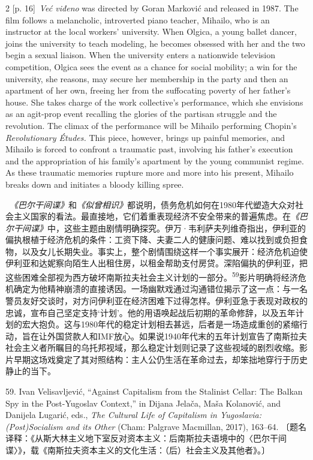 \documentclass[10pt,a4paper]{article}
\begin{document}
\begin{paracol}{2}
{\scriptsize\color{gray} [p. 16]}\ \textit{Već viđeno} was directed by Goran Marković and released in 1987. The film follows a melancholic, introverted piano teacher, Mihailo, who is an instructor at the local workers’ university. When Olgica, a young ballet dancer, joins the university to teach modeling, he becomes obsessed with her and the two begin a sexual liaison. When the university enters a nationwide television competition, Olgica sees the event as a chance for social mobility; a win for the university, she reasons, may secure her membership in the party and then an apartment of her own, freeing her from the suffocating poverty of her father’s house. She takes charge of the work collective’s performance, which she envisions as an agit-prop event recalling the glories of the partisan struggle and the revolution. The climax of the performance will be Mihailo performing Chopin’s \textit{Revolutionary Études.} This piece, however, brings up painful memories, and Mihailo is forced to confront a traumatic past, involving his father’s execution and the appropriation of his family’s apartment by the young communist regime. As these traumatic memories rupture more and more into his present, Mihailo breaks down and initiates a bloody killing spree.\par
\switchcolumn*
{\scriptsize\color{gray} [p. 17]}\ \textit{《巴尔干间谍》}和\textit{《似曾相识》}都说明，债务危机如何在1980年代塑造大众对社会主义国家的看法。最直接地，它们着重表现经济不安全带来的普遍焦虑。在\textit{《巴尔干间谍》}中，这些主题由剧情明确探究。伊万·韦利萨夫列维奇指出，伊利亚的偏执根植于经济危机的条件：工资下降、夫妻二人的健康问题、难以找到或负担食物，以及女儿长期失业。事实上，整个剧情围绕这样一个事实展开：经济危机迫使伊利亚和达妮察向陌生人出租住房，以租金帮助支付房贷。深陷偏执的伊利亚，把这些困难全部视为西方破坏南斯拉夫社会主义计划的一部\mbox{分。\textsuperscript{59}}影片明确将经济危机确定为他精神崩溃的直接诱因。一场幽默戏通过沟通错位揭示了这一点：与一名警员友好交谈时，对方问伊利亚在经济困难下过得怎样。伊利亚急于表现对政权的忠诚，宣布自己坚定支持‘计划’。他的用语唤起战后初期的革命修辞，以及五年计划的宏大抱负。这与1980年代的稳定计划相去甚远，后者是一场造成重创的紧缩行动，旨在让外国贷款人和IMF放心。如果说1940年代末的五年计划宣告了南斯拉夫社会主义者所瞩目的乌托邦视域，那么稳定计划则记录了这些视域的剧烈收缩。影片早期这场戏奠定了其对照结构：主人公仍生活在革命过去，却笨拙地穿行于历史静止的当下。\par{\small 59. Ivan Velisavljević, “Against Capitalism from the Stalinist Cellar: The Balkan Spy in the Post-Yugoslav Context,” in Dijana Jelača, Maša Kolanović, and Danijela Lugarić, eds., \textit{The Cultural Life of Capitalism in Yugoslavia: (Post)Socialism and its Other} (Cham: Palgrave Macmillan, 2017), 163–64. 〔题名译释：《从斯大林主义地下室反对资本主义：后南斯拉夫语境中的〈巴尔干间谍〉》，载《南斯拉夫资本主义的文化生活：（后）社会主义及其他者》。〕\par}

\end{paracol}
\end{document}

